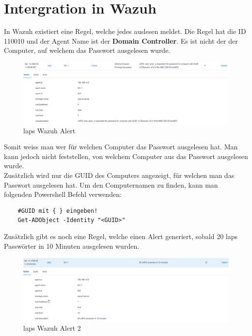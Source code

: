 \section{Intergration in Wazuh}
In Wazuh existiert eine Regel, welche jedes auslesen meldet.
Die Regel hat die ID 110010 und der Agent Name ist der \textbf{Domain Controller}.
Es ist nicht der der Computer, auf welchem das Passwort ausgelesen wurde.
\begin{figure}[H]
    \centering
    \includegraphics[width=\linewidth]{../img/LAPS/laps-wazuh.png}
    \caption{\acrshort{laps} Wazuh Alert}
\end{figure}
Somit weiss man wer für welchen Computer das Passwort ausgelesen hat.
Man kann jedoch nicht feststellen, von welchem Computer aus das Passwort ausgelesen wurde.\\

Zusätzlich wird nur die GUID des Computers angezeigt, für welchen man das Passwort ausgelesen hat.
Um den Computernamen zu finden, kann man folgenden Powershell Befehl verwenden:
\begin{lstlisting}
    #GUID mit { } eingeben!
    Get-ADObject -Identity "<GUID>"
\end{lstlisting}

Zusätzlich gibt es noch eine Regel, welche einen Alert generiert, sobald 20 \acrshort{laps} Passwörter in 10 Minuten ausgelesen wurden.
\begin{figure}[H]
    \centering
    \includegraphics[width=\linewidth]{../img/LAPS/laps-wazuh-alert.png}
    \caption{\acrshort{laps} Wazuh Alert 2}
\end{figure}